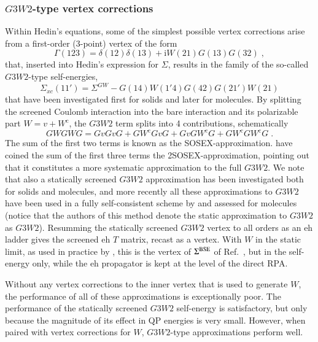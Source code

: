\documentclass[aip,jcp,reprint,noshowkeys,superscriptaddress]{revtex4-1}
\newcommand{\ii}{\mathrm{i}}
\newcommand{\eh}{\text{eh}}
\begin{document}
\subsubsection{$G3W2$-type vertex corrections}
Within Hedin's equations, some of the simplest 
possible vertex corrections arise from a first-order (3-point) vertex 
of the form\cite{Romaniello2012,Bruneval2024} 
\begin{equation}
	\Gamma(123) = \delta(12)\delta(13) + \ii W(21)G(13)G(32) \;,
\end{equation} 
that, inserted into Hedin's expression for $\Sigma$, results in the 
family of the so-called $G3W2$-type self-energies, 
\begin{equation}
	\label{eq:g3w2}
	\Sigma_{xc}(11') = \Sigma^{GW} - G(14)W(1'4)G(42)G(21')W(21)
\end{equation}
that have been investigated first for solids
\cite{Bobbert1994,Ummels1998,Kutepov2016,Kutepov2017a,Pavlyukh2020} and later for molecules.\cite{Bruneval2024,Yoneyama2024}
By splitting the screened Coulomb interaction into the bare interaction
and its polarizable part $W = v + W^\text{c}$, the $G3W2$ term splits into 
4 contributions, schematically
\begin{equation}
	GWGWG = GvGvG + GW^\text{c}GvG + GvGW^\text{c}G + GW^\text{c}GW^\text{c}G \;.
\end{equation}
The sum of the first two terms is known as the SOSEX-approximation.\cite{Ren2015,Vacondio2022}
\citet{Bruneval2024} have coined the sum of the first three terms the 
2SOSEX-approximation, pointing out that it constitutes a more systematic 
approximation to the full $G3W2$. We note that also a statically screened 
$G3W2$ approximation has been investigated both for
solids\cite{Gruneis2014} and molecules,\cite{Forster2022} and more recently all these
approximations to $G3W2$ have been used in a fully self-consistent scheme by
\citet{Pokhilko2025} and assessed for molecules\cite{Wang2026}
(notice that the authors of this method denote the
static approximation to $G3W2$ as $G3W2$).
Resumming the statically screened $G3W2$ vertex to all orders as an
$\eh$ ladder gives the screened $\eh$ $T$ matrix, recast as a
vertex.\cite{Romaniello2012} With $W$ in the static limit, as used in
practice by \citet{Romaniello2012}, this is the vertex of
$\Sigma^{\rm BSE}$ of Ref.~, but in the self-energy
only, while the $\eh$ propagator is kept at the level of the direct RPA.

Without any vertex corrections to the inner vertex that is used to generate $W$, 
the performance of all of these approximations is exceptionally poor. 
The performance of the statically screened $G3W2$ self-energy is satisfactory, 
but only because the magnitude of its effect in QP energies is very small.
\cite{Forster2022} However, when paired with vertex corrections for $W$,
$G3W2$-type approximations perform well.\cite{Gruneis2014, Forster2024} 
\end{document}
